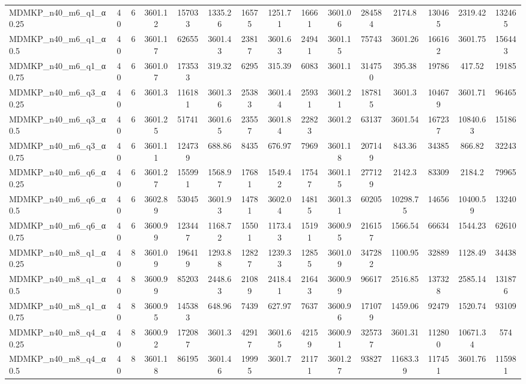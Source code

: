 \begin{table}[!ht]
{\begin{tabular}{lcccccccccccccc}
MDMKP\_n40\_m6\_q1\_α0.25 & 40 & 6 & 3601.12 & 157033 & 1335.26 & 16575 & 1251.71 & 16661 & 3601.06 & 284584 & 2174.8 & 130465 & 2319.42 & 132465 \\
MDMKP\_n40\_m6\_q1\_α0.5 & 40 & 6 & 3601.17 & 62655 & 3601.43 & 23817 & 3601.63 & 24941 & 3601.15 & 75743 & 3601.26 & 166162 & 3601.75 & 156443 \\
MDMKP\_n40\_m6\_q1\_α0.75 & 40 & 6 & 3601.07 & 173533 & 319.32 & 6295 & 315.39 & 6083 & 3601.1 & 314750 & 395.38 & 19786 & 417.52 & 19185 \\
MDMKP\_n40\_m6\_q3\_α0.25 & 40 & 6 & 3601.3 & 116181 & 3601.36 & 25383 & 3601.44 & 25931 & 3601.21 & 187815 & 3601.3 & 104679 & 3601.71 & 96465 \\
MDMKP\_n40\_m6\_q3\_α0.5 & 40 & 6 & 3601.25 & 51741 & 3601.65 & 23557 & 3601.84 & 22823 & 3601.2 & 63137 & 3601.54 & 167237 & 10840.63 & 15186 \\
MDMKP\_n40\_m6\_q3\_α0.75 & 40 & 6 & 3601.11 & 124739 & 688.86 & 8435 & 676.97 & 7969 & 3601.18 & 207149 & 843.36 & 34385 & 866.82 & 32243 \\
MDMKP\_n40\_m6\_q6\_α0.25 & 40 & 6 & 3601.27 & 155991 & 1568.97 & 17681 & 1549.42 & 17547 & 3601.15 & 277129 & 2142.3 & 83309 & 2184.2 & 79965 \\
MDMKP\_n40\_m6\_q6\_α0.5 & 40 & 6 & 3602.89 & 53045 & 3601.93 & 14781 & 3602.04 & 14815 & 3601.31 & 60205 & 10298.75 & 14656 & 10400.59 & 13240 \\
MDMKP\_n40\_m6\_q6\_α0.75 & 40 & 6 & 3600.99 & 123447 & 1168.72 & 15501 & 1173.43 & 15191 & 3600.95 & 216157 & 1566.54 & 66634 & 1544.23 & 62610 \\
MDMKP\_n40\_m8\_q1\_α0.25 & 40 & 8 & 3601.09 & 196419 & 1293.88 & 12827 & 1239.33 & 12855 & 3601.09 & 347282 & 1100.95 & 32889 & 1128.49 & 34438 \\
MDMKP\_n40\_m8\_q1\_α0.5 & 40 & 8 & 3600.99 & 85203 & 2448.63 & 21089 & 2418.41 & 21643 & 3600.99 & 96617 & 2516.85 & 137328 & 2585.14 & 131876 \\
MDMKP\_n40\_m8\_q1\_α0.75 & 40 & 8 & 3600.95 & 145383 & 648.96 & 7439 & 627.97 & 7637 & 3600.96 & 171079 & 1459.06 & 92479 & 1520.74 & 93109 \\
MDMKP\_n40\_m8\_q4\_α0.25 & 40 & 8 & 3600.92 & 172087 & 3601.3 & 42917 & 3601.65 & 42159 & 3600.91 & 325737 & 3601.31 & 112800 & 10671.34 & 574 \\
MDMKP\_n40\_m8\_q4\_α0.5 & 40 & 8 & 3601.18 & 86195 & 3601.46 & 19995 & 3601.7 & 21171 & 3601.27 & 93827 & 11683.39 & 117451 & 3601.76 & 115981 \\

\end{tabular}}
\end{table}
